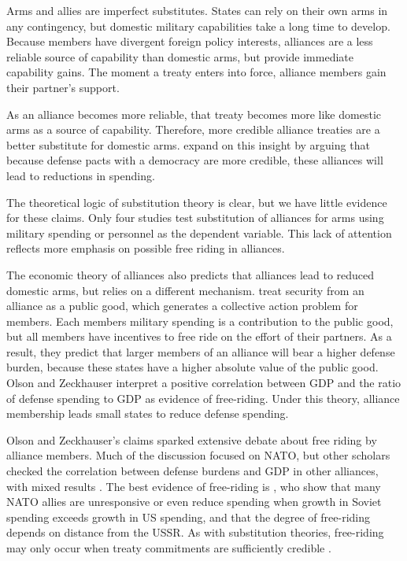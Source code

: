 \documentclass[12pt]{article}
\begin{document}
Arms and allies are imperfect substitutes. States can rely on their own arms in any contingency, but domestic military capabilities take a long time to develop. Because members have divergent foreign policy interests, alliances are a less reliable source of capability than domestic arms, but provide immediate capability gains. The moment a treaty enters into force, alliance members gain their partner's support.

As an alliance becomes more reliable, that treaty becomes more like domestic arms as a source of capability. Therefore, more credible alliance treaties are a better substitute for domestic arms. \citet{DigiuseppePoast2016} expand on this insight by arguing that because defense pacts with a democracy are more credible, these alliances will lead to reductions in spending. 

The theoretical logic of substitution theory is clear, but we have little evidence for these claims. Only four studies test substitution of alliances for arms using military spending or personnel as the dependent variable. This lack of attention reflects more emphasis on possible free riding in alliances. 

The economic theory of alliances also predicts that alliances lead to reduced domestic arms, but relies on a different mechanism. \citet{OlsonZeckhauser1966} treat security from an alliance as a public good, which generates a collective action problem for members. Each members military spending is a contribution to the public good, but all members have incentives to free ride on the effort of their partners. As a result, they predict that larger members of an alliance will bear a higher defense burden, because these states have a higher absolute value of the public good. Olson and Zeckhauser interpret a positive correlation between GDP and the ratio of defense spending to GDP as evidence of free-riding. Under this theory, alliance membership leads small states to reduce defense spending. 

Olson and Zeckhauser's claims sparked extensive debate about free riding by alliance members. Much of the discussion focused on NATO, but other scholars checked the correlation between defense burdens and GDP in other alliances, with mixed results \citep{Reisinger1983, Thies1987, GatesTerasawa1992, OnealWhatley1996, Siroky2012}. The best evidence of free-riding is \citet{PluemperNeumayer2015}, who show that many NATO allies are unresponsive or even reduce spending when growth in Soviet spending exceeds growth in US spending, and that the degree of free-riding depends on distance from the USSR. As with substitution theories, free-riding may only occur when treaty commitments are sufficiently credible \citep{GatesTerasawa1992}. 
\end{document}
